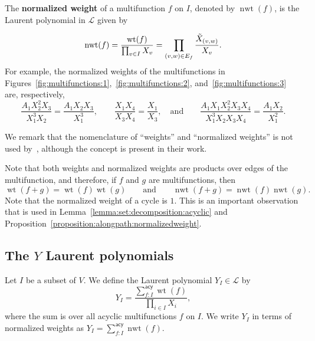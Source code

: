 \documentclass[11pt]{article}
\theoremstyle{definition}
\numberwithin{equation}{section}
\newcommand{\vocab}[1]{\textbf{#1}}
\newcommand{\vertices}{V}
\newcommand{\edges}{E}
\newcommand{\laurentpolynomialring}{\mathcal{L}}
\DeclareMathOperator{\normalizedweight}{nwt}
\DeclareMathOperator{\weight}{wt}
\newcommand{\sumacy}[1]{\sum_{#1}^{\mathsf{acy}}}
\begin{document}
The \vocab{normalized weight} of a multifunction \(f\) on \(I\), denoted by \(\normalizedweight(f)\), is the Laurent polynomial in \(\laurentpolynomialring\) given by

\begin{equation*}
    \normalizedweight(f)
    = \frac{\weight(f)}{\prod_{v \in I} X_v}
    = \prod_{(v, w) \in \edges_f} \frac{\Tilde{X}_{(v, w)}}{X_v}.
\end{equation*}
For example,
the normalized weights of the multifunctions in Figures~\ref{fig:multifunctions:1},~\ref{fig:multifunctions:2}, and~\ref{fig:multifunctions:3} are, respectively,
\begin{equation*}
    \frac{A_1 X_2^2 X_3}{X_1^3 X_2} = 
    \frac{A_1 X_2 X_3}{X_1^3},
    \qquad
    \frac{X_1 X_4}{X_3 X_4}=
    \frac{X_1}{X_3},
    \quad
    \text{and}
    \qquad
    \frac{A_1 X_1 X_2^2 X_3 X_4}{X_1^3 X_2 X_3 X_4} =
    \frac{A_1 X_2}{X_1^2}.
\end{equation*}

We remark that the nomenclature of ``weights'' and ``normalized weights'' is not used by~\cite{linearLP}, although the concept is present in their work.

Note that both weights and normalized weights are products over edges of the multifunction, and therefore, if \(f\) and \(g\) are multifunctions, then 
\begin{equation*}
    \weight(f + g) = \weight(f) \weight(g)
    \qquad \text{and} \qquad
    \normalizedweight(f + g) = \normalizedweight(f) \normalizedweight(g).
\end{equation*}
Note that the normalized weight of a cycle is \(1\).
This is an important observation that is used in Lemma~\ref{lemma:set:decomposition:acyclic} and Proposition~\ref{proposition:alongpath:normalizedweight}.

\subsection{The \texorpdfstring{\(Y\)}{Y} Laurent polynomials} \label{subsection:Ylaurentpolynomials}

Let \(I\) be a subset of \(\vertices\).
We define the Laurent polynomial \(Y_I \in \laurentpolynomialring\) by
\begin{equation*}
    Y_I = \frac{\sumacy{f : I} \weight(f)}{\prod_{i \in I} X_i},
\end{equation*}
where the sum is over all acyclic multifunctions \(f\) on \(I\).
We write \(Y_I\) in terms of normalized weights as \(Y_I = \sumacy{f:I} \normalizedweight(f)\).
\end{document}
